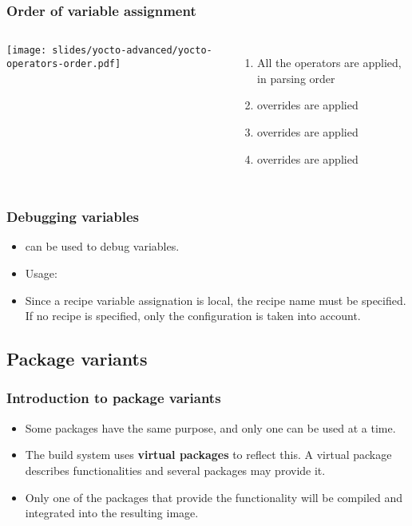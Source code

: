 \begin{frame}
  \frametitle{Order of variable assignment}
  \begin{columns}
      \texttt{[image: slides/yocto-advanced/yocto-operators-order.pdf]}
      \begin{enumerate}
        \item All the operators are applied, in parsing order
        \item {} overrides are applied
        \item {} overrides are applied
        \item {} overrides are applied
      \end{enumerate}
  \end{columns}
\end{frame}

\begin{frame}
  \frametitle{Debugging variables}
  \begin{itemize}
    \item {} can be used to debug variables.
    \item Usage: 
	\item Since a recipe variable assignation is local, the recipe name must be
	  specified. If no recipe is specified, only the configuration is taken into
	  account.
  \end{itemize}
\end{frame}

\subsection{Package variants}

\begin{frame}
  \frametitle{Introduction to package variants}
  \begin{itemize}
    \item Some packages have the same purpose, and only one can be
      used at a time.
    \item The build system uses {\bf virtual packages} to reflect
      this. A virtual package describes functionalities and several
      packages may provide it.
    \item Only one of the packages that provide the functionality will
    be compiled and integrated into the resulting image.
  \end{itemize}
\end{frame}

